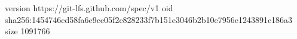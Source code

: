 version https://git-lfs.github.com/spec/v1
oid sha256:1454746cd58fa6e9ce05f2c828233f7b151e3046b2b10e7956e1243891c186a3
size 1091766
